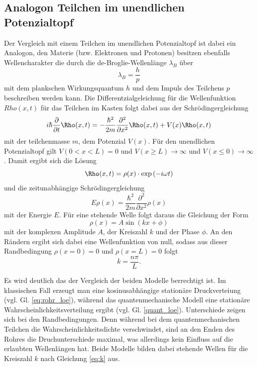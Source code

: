 \subsection{Analogon Teilchen im unendlichen Potenzialtopf}
Der Vergleich mit einem Teilchen im unendlichen Potenzialtopf ist dabei ein Analogon, 
den Materie (bzw. Elektronen und Protonen) besitzen ebenfalls Wellencharakter die durch die de-Broglie-Wellenlänge $\lambda_B$ über
\begin{equation}
    \lambda_B=\frac{h}{p}
\end{equation}
mit dem plankschen Wirkungsquantum $h$ und dem Impuls des Teilchens $p$ beschreiben werden kann.
Die Differentzialgeleichung für die Wellenfunktion $Rho(x,t)$ für das Teilchen im Kasten folgt dabei aus der Schrödingergleichung
\begin{equation}
    i\hbar \frac{\partial}{\partial t}\Rho(x,t)=-\frac{\hbar^2}{2m}\frac{\partial^2}{\partial x^2}\Rho(x,t)+V(x)\Rho(x,t)
\end{equation}
mit der teilchenmasse $m$, dem Potenzial $V(x)$. Für den unendlichen Potenzialtopf gilt $V(0 < x < L)=0$ und
$V(x \geq L)\rightarrow \infty$ und $V(x \leq 0)\rightarrow \infty$.
Damit ergibt sich die Lösung
\begin{equation}
    \Rho(x,t)=\rho(x)\cdot \exp{(-i\omega t)}
\end{equation}
und die zeitunabhängige Schrödingergleichung
\begin{equation}
    E\rho(x)=\frac{\hbar^2}{2m}\frac{\partial^2}{\partial x^2}\rho(x)
\end{equation}
mit der Energie $E$.
Für eine stehende Welle folgt daraus die Gleichung der Form
\begin{equation}
    \rho(x)=A\sin{(kx+\phi)}
    \label{eq:quant_loe}
\end{equation}
mit der komplexen Amplitude $A$, der Kreiszahl $k$ und der Phase $\phi$.
An den Rändern ergibt sich dabei eine Wellenfunktion von null, sodass aus dieser Randbedingung
$\rho(x=0)=0$ und $\rho(x=L)=0$ folgt
\begin{equation}
    k=\frac{n\pi}{L}.
    \label{eq:k}
\end{equation} 

Es wird deutlich das der Vergleich der beiden Modelle berrechtigt ist. Im klassischen Fall erzeugt man eine kosinusabhängige stationäre
Druckverteiung (vgl. Gl. \ref{eq:rohr_loe}), während das quantenmechanische Modell 
eine stationäre Wahrscheinlichkeitsverteilung ergibt (vgl. Gl. \ref{quant_loe}). Unterschiede zeigen sich bei den Randbedingungen.
Denn während bei dem quantenmechanischen Teilchen die Wahrscheinlichkeitsdichte verschwindet, sind an den Enden des Rohres 
die Druchunterschiede maximal, was allerdings kein Einfluss auf die erlaubten Wellenlängen hat.
Beide Modelle bilden dabei stehende Wellen für die Kreiszahl $k$ nach Gleichung \ref{eq:k} aus.


